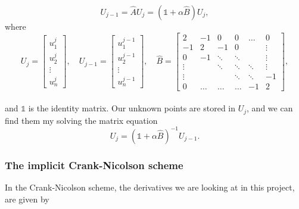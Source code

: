 \documentclass[12pt]{article}
\begin{document}
\begin{flushleft}
\vspace{5mm}
\begin{equation}\label{eq:implicit_form_Euler}
U_{j-1} = \hat{A}U_{j} = (\mathbb{1}+\alpha\hat{B})U_j,
\end{equation}
where
\vspace{5mm}
\begin{equation}\label{eq:bkward_Euler_B}
U_j = 
\begin{bmatrix}
         u_1^j\\
         u_2^j\\
       \vdots\\
       u_n^j
     \end{bmatrix},\quad
U_{j-1} = 
\begin{bmatrix}
         u_1^{j-1}\\
         u_2^{j-1}\\
       \vdots\\
       u_n^{j-1}
     \end{bmatrix},\quad
\hat{B} = 
\begin{bmatrix}
       2 & -1 & 0 & 0 & \dots  & 0        \\
       -1 & 2 & -1 & 0  &  & \vdots \\
       0  & -1 & \ddots & \ddots & & \vdots \\
       \vdots &  & \ddots & \ddots & \ddots & \vdots \\
       \vdots & & & \ddots & \ddots & -1\\
       0 & \dots & \dots & \dots & -1 & 2
     \end{bmatrix},
\end{equation}\\
\vspace{5mm}
and $\mathbb{1}$ is the identity matrix. Our unknown points are stored in $U_j$, and we can find them my solving the matrix equation
\vspace{5mm}
\begin{equation}\label{eq:bkwrd_Euler_matrix}
U_j = (\mathbb{1}+\alpha\hat{B})^{-1}U_{j-1}.
\end{equation}
\vspace{5mm}
\subsubsection{The implicit Crank-Nicolson scheme\label{sect:numerical_crank-nicolson}}
In the Crank-Nicolson scheme, the derivatives we are looking at in this project, are given by


\end{flushleft}
\end{document}
